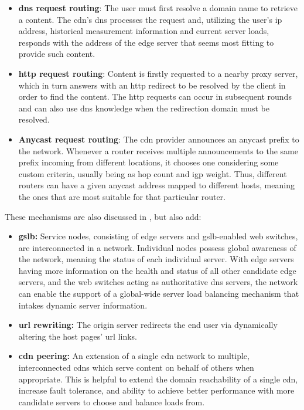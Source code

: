 \begin{itemize}
    \item \textbf{\gls{dns} request routing}: The user must first resolve a domain name to retrieve a content. The \gls{cdn}'s \gls{dns} processes the request and, utilizing the user's \gls{ip} address, historical measurement information and current server loads, responds with the address of the edge server that seems most fitting to provide such content.
    \item \textbf{\gls{http} request routing}: Content is firstly requested to a nearby proxy server, which in turn answers with an \gls{http} redirect to be resolved by the client in order to find the content.
        The \gls{http} requests can occur in subsequent rounds and can also use \gls{dns} knowledge when the redirection domain must be resolved.
    \item \textbf{Anycast request routing}: The \gls{cdn} provider announces an anycast prefix to the network.
        Whenever a router receives multiple announcements to the same prefix incoming from different locations, it chooses one considering some custom criteria, usually being \gls{as} hop count and \gls{igp} weight.
        Thus, different routers can have a given anycast address mapped to different hosts, meaning the ones that are most suitable for that particular router.
\end{itemize}

    These mechanisms are also discussed in \cite{cdn-survey}, but also add:

\begin{itemize}
    \item \textbf{\gls{gslb}:} Service nodes, consisting of edge servers and \gls{gslb}-enabled web switches, are interconnected in a network.
        Individual nodes possess global awareness of the network, meaning the status of each individual server.
        With edge servers having more information on the health and status of all other candidate edge servers, and the web switches acting as authoritative \gls{dns} servers, the network can enable the support of a global-wide server load balancing mechanism that intakes dynamic server information.
    \item \textbf{\gls{url} rewriting:} The origin server redirects the end user via dynamically altering the host pages' \gls{url} links.
    \item \textbf{\gls{cdn} peering:} An extension of a single \gls{cdn} network to multiple, interconnected \glspl{cdn} which serve content on behalf of others when appropriate.
        This is helpful to extend the domain reachability of a single \gls{cdn}, increase fault tolerance, and ability to achieve better performance with more candidate servers to choose and balance loads from.
\end{itemize}


